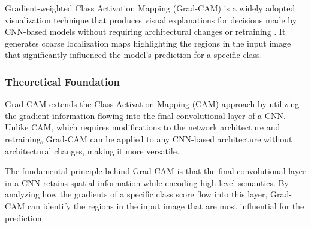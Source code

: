 \documentclass[a4paper,12pt]{report}
\begin{document}
Gradient-weighted Class Activation Mapping (Grad-CAM) is a widely adopted visualization technique that produces visual explanations for decisions made by CNN-based models without requiring architectural changes or retraining \citep{Selvaraju_2019}. It generates coarse localization maps highlighting the regions in the input image that significantly influenced the model's prediction for a specific class.

\subsubsection{Theoretical Foundation}

Grad-CAM extends the Class Activation Mapping (CAM) approach \citep{zhou2015learningdeepfeaturesdiscriminative} by utilizing the gradient information flowing into the final convolutional layer of a CNN. Unlike CAM, which requires modifications to the network architecture and retraining, Grad-CAM can be applied to any CNN-based architecture without architectural changes, making it more versatile.

The fundamental principle behind Grad-CAM is that the final convolutional layer in a CNN retains spatial information while encoding high-level semantics. By analyzing how the gradients of a specific class score flow into this layer, Grad-CAM can identify the regions in the input image that are most influential for the prediction.

\end{document}
